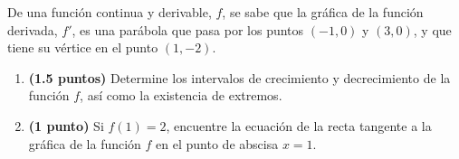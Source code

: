 
De una función continua y derivable, $f$, se sabe que la gráfica de la función derivada, $f'$, es una parábola que pasa por los puntos $(-1,0)$ y $(3,0)$, y que tiene su vértice en el punto $(1,-2)$.
\begin{enumerate}[label=\alph*)]
\item \textbf{(1.5 puntos)} Determine los intervalos de crecimiento y decrecimiento de la función $f$, así como la existencia de extremos.
\item \textbf{(1 punto)} Si $f(1)=2$, encuentre la ecuación de la recta tangente a la gráfica de la función $f$ en el punto de abscisa $x=1$.
\end{enumerate}
